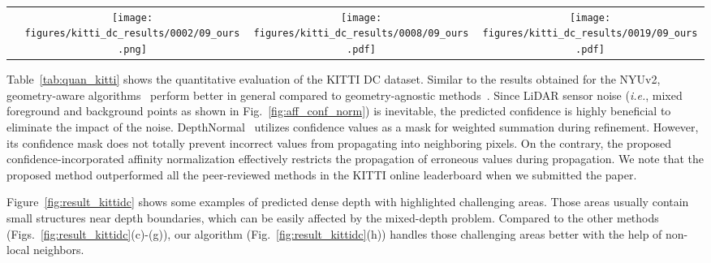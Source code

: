 \documentclass[runningheads]{llncs}
\newcommand{\figref}[1]{Fig.~\ref{#1}}
\newcommand{\figsref}[1]{Figs.~\ref{#1}}
\newcommand{\Figref}[1]{Figure~\ref{#1}}
\newcommand{\Tabref}[1]{Table~\ref{#1}}
\newcommand{\csmall}{\fontsize{8}{9.5}\selectfont}
\begin{document}
\begin{figure*}[t]
\begin{center}
\begin{tabular}{@{}c@{\hskip 0.001\linewidth}c@{\hskip 0.001\linewidth}c@{\hskip 0.001\linewidth}c}
\raisebox{2\height}{{\csmall (h)}}  &
\texttt{[image: figures/kitti\_dc\_results/0002/09\_ours.png]} &
\texttt{[image: figures/kitti\_dc\_results/0008/09\_ours.pdf]} &
\texttt{[image: figures/kitti\_dc\_results/0019/09\_ours.pdf]} \\
\end{tabular}
\caption{\textbf{Depth completion results on the KITTI DC dataset~\cite{uhrig2017sparsity}}. (a) RGB, (b) Sparse depth, (c) CSPN~\cite{cheng2018depth}, (d) DepthNormal~\cite{xu2019depth}, (e) DeepLiDAR~\cite{qiu2019deeplidar}, (f) FuseNet~\cite{chen2019learning}, (g) CSPN++~\cite{cheng2019cspnpp}, (h) Ours. Note that sparse depth images are dilated for visualization.}
\label{fig:result_kittidc}
\end{center}
\end{figure*}


\Tabref{tab:quan_kitti} shows the quantitative evaluation of the KITTI DC dataset. 
Similar to the results obtained for the NYUv2, geometry-aware algorithms~\cite{xu2019depth,qiu2019deeplidar,chen2019learning,cheng2019cspnpp} perform better in general compared to geometry-agnostic methods~\cite{ma2018sparse,cheng2018depth}. 
Since LiDAR sensor noise (\textit{i.e.}, mixed foreground and background points as shown in \figref{fig:aff_conf_norm}) is inevitable, the predicted confidence is highly beneficial to eliminate the impact of the noise. 
DepthNormal~\cite{xu2019depth} utilizes confidence values as a mask for weighted summation during refinement. 
However, its confidence mask does not totally prevent incorrect values from propagating into neighboring pixels. 
On the contrary, the proposed confidence-incorporated affinity normalization effectively restricts the propagation of erroneous values during propagation. 
We note that the proposed method outperformed all the peer-reviewed methods in the KITTI online leaderboard when we submitted the paper.

\Figref{fig:result_kittidc} shows some examples of predicted dense depth with highlighted challenging areas. 
Those areas usually contain small structures near depth boundaries, which can be easily affected by the mixed-depth problem. 
Compared to the other methods (\figsref{fig:result_kittidc}(c)-(g)), our algorithm (\figref{fig:result_kittidc}(h)) handles those challenging areas better with the help of non-local neighbors.
\end{document}
